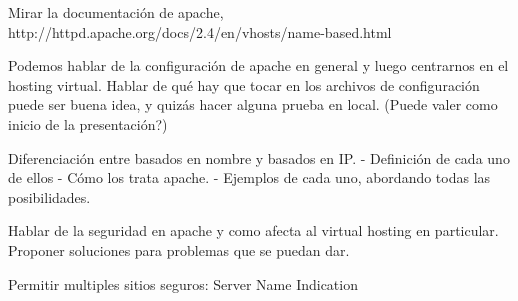 \documentclass[a4paper, 10pt]{article} %
\begin{document}
Mirar la documentación de apache, http://httpd.apache.org/docs/2.4/en/vhosts/name-based.html

Podemos hablar de la configuración de apache en general y luego centrarnos en el hosting virtual. Hablar de qué hay que tocar en los archivos de configuración puede ser buena idea, y quizás hacer alguna prueba en local. (Puede valer como inicio de la presentación?) 

Diferenciación entre basados en nombre y basados en IP. 
	- Definición de cada uno de ellos
	- Cómo los trata apache. 
	- Ejemplos de cada uno, abordando todas las posibilidades. 

Hablar de la seguridad en apache y como afecta al virtual hosting en particular. Proponer soluciones para problemas que se puedan dar. 

Permitir multiples sitios seguros: Server Name Indication 
\end{document}

